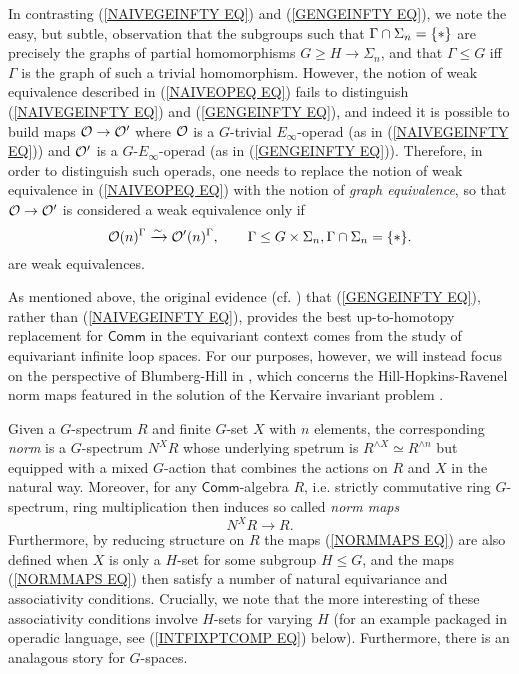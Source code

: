 \documentclass[a4paper,10pt]{article}%
\begin{document}
In contrasting 
(\ref{NAIVEGEINFTY EQ}) and (\ref{GENGEINFTY EQ}),
we note the easy, but subtle, observation that the subgroups such that $\Gamma \cap \Sigma_n = \{\**\}$ 
are precisely the graphs of partial homomorphisms 
$G \geq H \to \Sigma_n$,
and that $\Gamma \leq G$ iff $\Gamma$ is the graph of such a trivial homomorphism. 
However, the notion of weak equivalence described in (\ref{NAIVEOPEQ EQ}) fails to distinguish
(\ref{NAIVEGEINFTY EQ}) and (\ref{GENGEINFTY EQ}), 
and indeed it is possible
to build maps $\mathcal{O} \to \mathcal{O}'$ where
$\mathcal{O}$ is a $G$-trivial $E_{\infty}$-operad (as in (\ref{NAIVEGEINFTY EQ}))
and $\mathcal{O}'$ is a $G$-$E_{\infty}$-operad 
(as in (\ref{GENGEINFTY EQ})).
Therefore, in order to distinguish such operads, one needs to replace the notion of weak equivalence in (\ref{NAIVEOPEQ EQ}) 
with the notion of \textit{graph equivalence}, 
so that $\mathcal{O} \to \mathcal{O}'$ is considered a weak equivalence only if
\begin{equation}\label{GENEOPEQ EQ}
	\O(n)^{\Gamma} \xrightarrow{\sim} \O'(n)^{\Gamma}, \qquad
	\Gamma \leq G\times \Sigma_n, \Gamma \cap \Sigma_n = \{\**\}.
\end{equation}
are weak equivalences.


As mentioned above, the original evidence (cf. \cite{CW91}) 
that (\ref{GENGEINFTY EQ}), 
rather than (\ref{NAIVEGEINFTY EQ}), 
provides the best up-to-homotopy replacement for $\mathsf{Comm}$ in the equivariant context comes from the study of equivariant infinite loop spaces.
For our purposes, however, we will instead focus on the perspective of Blumberg-Hill in \cite{BH15},
which concerns the Hill-Hopkins-Ravenel norm maps featured in the solution of the Kervaire invariant problem \cite{HHR}.

Given a $G$-spectrum $R$ and finite $G$-set $X$ with $n$ elements, 
the corresponding \textit{norm} is a $G$-spectrum $N^X R$
whose underlying spetrum is 
$R^{\wedge X} \simeq R^{\wedge n}$
but equipped with a mixed $G$-action that combines the actions on $R$ and $X$ in the natural way.
Moreover, for any $\mathsf{Comm}$-algebra $R$, i.e. strictly commutative ring $G$-spectrum, 
ring multiplication then induces so called \textit{norm maps}
\begin{equation}\label{NORMMAPS EQ}
	N^X R \to R.
\end{equation}
Furthermore, by reducing structure on $R$ the maps (\ref{NORMMAPS EQ}) are also defined when $X$ is only a $H$-set for some subgroup $H \leq G$, and the maps (\ref{NORMMAPS EQ})
then satisfy a number of 
natural equivariance and associativity conditions.
Crucially,  we note that the more interesting of these associativity conditions involve $H$-sets for varying $H$
(for an example packaged in operadic language,
see (\ref{INTFIXPTCOMP EQ}) below).
Furthermore, there is an analagous story for $G$-spaces.
\end{document}
